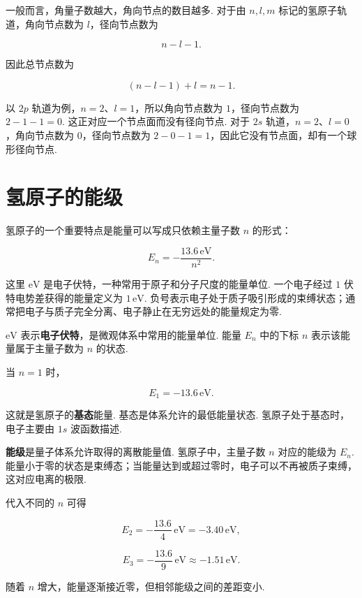 \documentclass[UTF8,11pt,a4paper,openany]{ctexbook}
\newcommand{\term}[1]{\textbf{#1}}
\begin{document}
一般而言，角量子数越大，角向节点的数目越多. 对于由 $n,l,m$ 标记的氢原子轨道，角向节点数为 $l$，径向节点数为

\[
n-l-1.
\]

因此总节点数为

\[
(n-l-1)+l=n-1.
\]

\begin{derivationbox}
以 $2p$ 轨道为例，$n=2$、$l=1$，所以角向节点数为 $1$，径向节点数为 $2-1-1=0$. 这正对应一个节点面而没有径向节点. 对于 $2s$ 轨道，$n=2$、$l=0$，角向节点数为 $0$，径向节点数为 $2-0-1=1$，因此它没有节点面，却有一个球形径向节点. 
\end{derivationbox}

\section{氢原子的能级}

氢原子的一个重要特点是能量可以写成只依赖主量子数 $n$ 的形式：

\[
E_n=-\frac{13.6\,\text{eV}}{n^2}.
\]

这里 $\text{eV}$ 是电子伏特，一种常用于原子和分子尺度的能量单位. 一个电子经过 $1$ 伏特电势差获得的能量定义为 $1\,\text{eV}$. 负号表示电子处于质子吸引形成的束缚状态；通常把电子与质子完全分离、电子静止在无穷远处的能量规定为零. 

\begin{notationbox}
$\text{eV}$ 表示\term{电子伏特}，是微观体系中常用的能量单位. 能量 $E_n$ 中的下标 $n$ 表示该能量属于主量子数为 $n$ 的状态. 
\end{notationbox}

当 $n=1$ 时，

\[
E_1=-13.6\,\text{eV}.
\]

这就是氢原子的\term{基态}能量. 基态是体系允许的最低能量状态. 氢原子处于基态时，电子主要由 $1s$ 波函数描述. 

\begin{definitionbox}
\term{能级}是量子体系允许取得的离散能量值. 氢原子中，主量子数 $n$ 对应的能级为 $E_n$. 能量小于零的状态是束缚态；当能量达到或超过零时，电子可以不再被质子束缚，这对应电离的极限. 
\end{definitionbox}

代入不同的 $n$ 可得

\[
E_2=-\frac{13.6}{4}\,\text{eV}=-3.40\,\text{eV},
\]

\[
E_3=-\frac{13.6}{9}\,\text{eV}\approx -1.51\,\text{eV}.
\]

随着 $n$ 增大，能量逐渐接近零，但相邻能级之间的差距变小. 
\end{document}
